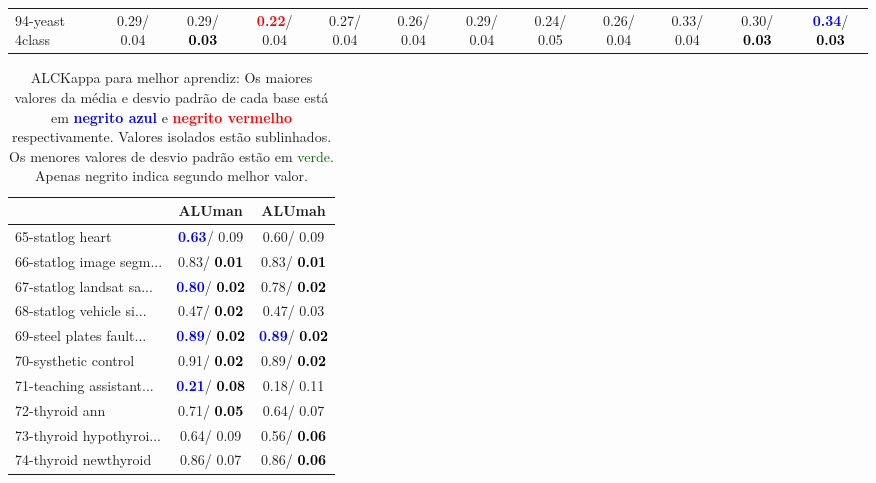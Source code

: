 \begin{table}[h]
\begin{center}
{\begin{tabular}{lc|c|c|c|c|c|c|c|c|c|c}
94-yeast 4class &   0.29/  0.04 &   0.29/\textcolor{black}{\textbf{  0.03}} & \textcolor{red}{\textbf{  0.22}}/  0.04 &   0.27/  0.04 &   0.26/  0.04 &   0.29/  0.04 &   0.24/  0.05 &   0.26/  0.04 &   0.33/  0.04 &   0.30/\textcolor{black}{\textbf{  0.03}} & \textcolor{blue}{\textbf{  0.34}}/\textcolor{black}{\textbf{  0.03}} \\\end{tabular}}\label{stratsALCKappa2bestReduxa}
\end{center}
\end{table}
\begin{table}[h]
\caption{ALCKappa para melhor aprendiz: Os maiores valores da média e desvio padrão de cada base está em \textcolor{blue}{\textbf{negrito azul}} e \textcolor{red}{\textbf{negrito vermelho}} respectivamente. Valores isolados estão sublinhados. Os menores valores de desvio padrão estão em \textcolor{darkgreen}{verde}. Apenas negrito indica segundo melhor valor.}
\begin{center}\begin{tabular}{lc|c}
 & ALUman & ALUmah\\ \hline 65-statlog heart & \textcolor{blue}{\textbf{  0.63}}/  0.09 &   0.60/  0.09 \\
66-statlog image segm... &   0.83/\textcolor{black}{\textbf{  0.01}} &   0.83/\textcolor{black}{\textbf{  0.01}} \\
67-statlog landsat sa... & \textcolor{blue}{\textbf{  0.80}}/\textcolor{black}{\textbf{  0.02}} &   0.78/\textcolor{black}{\textbf{  0.02}} \\
68-statlog vehicle si... &   0.47/\textcolor{black}{\textbf{  0.02}} &   0.47/  0.03 \\
69-steel plates fault... & \textcolor{blue}{\textbf{  0.89}}/\textcolor{black}{\textbf{  0.02}} & \textcolor{blue}{\textbf{  0.89}}/\textcolor{black}{\textbf{  0.02}} \\
70-systhetic control &   0.91/\textcolor{black}{\textbf{  0.02}} &   0.89/\textcolor{black}{\textbf{  0.02}} \\
71-teaching assistant... & \textcolor{blue}{\textbf{  0.21}}/\textcolor{black}{\textbf{  0.08}} &   0.18/  0.11 \\ \hline
72-thyroid ann &   0.71/\textcolor{black}{\textbf{  0.05}} &   0.64/  0.07 \\
73-thyroid hypothyroi... &   0.64/  0.09 &   0.56/\textcolor{black}{\textbf{  0.06}} \\
74-thyroid newthyroid &   0.86/  0.07 &   0.86/\textcolor{black}{\textbf{  0.06}} \\

\end{tabular}
\end{center}
\end{table}
